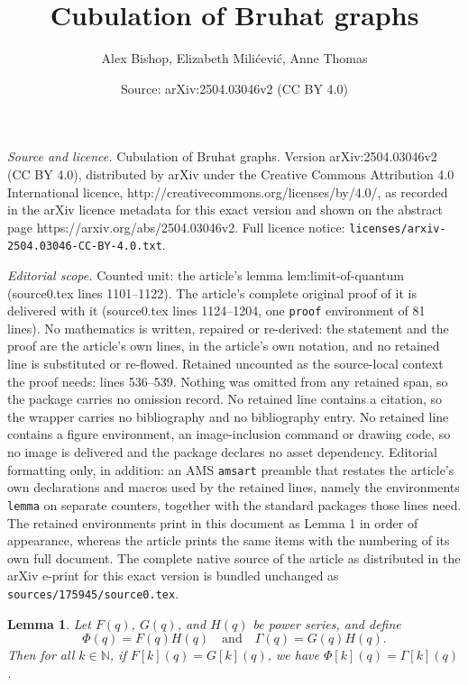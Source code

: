 \documentclass[10pt,a4paper]{amsart}
\title{Cubulation of Bruhat graphs}
\author{Alex Bishop, Elizabeth Mili\'cevi\'c, Anne Thomas}
\date{Source: arXiv:2504.03046v2 (CC BY 4.0)}
\newtheorem{lemma}{Lemma}
\newcommand{\N}{\mathbb{N}}
\begin{document}
\maketitle

\noindent\emph{Source and licence.} Cubulation of Bruhat graphs. Version arXiv:2504.03046v2 (CC BY 4.0), distributed by arXiv under the Creative Commons Attribution 4.0 International licence, http://creativecommons.org/licenses/by/4.0/, as recorded in the arXiv licence metadata for this exact version and shown on the abstract page https://arxiv.org/abs/2504.03046v2. Full licence notice: \texttt{licenses/arxiv-2504.03046-CC-BY-4.0.txt}.\par\smallskip

\noindent\textit{Editorial scope.} Counted unit: the article's lemma lem:limit-of-quantum (source0.tex lines 1101--1122). The article's complete original proof of it is delivered with it (source0.tex lines 1124--1204, one \texttt{proof} environment of 81 lines). No mathematics is written, repaired or re-derived: the statement and the proof are the article's own lines, in the article's own notation, and no retained line is substituted or re-flowed.  Retained uncounted as the source-local context the proof needs: lines 536--539.  Nothing was omitted from any retained span, so the package carries no omission record.  No retained line contains a citation, so the wrapper carries no bibliography and no bibliography entry.  No retained line contains a figure environment, an image-inclusion command or drawing code, so no image is delivered and the package declares no asset dependency.  Editorial formatting only, in addition: an AMS \texttt{amsart} preamble that restates the article's own declarations and macros used by the retained lines, namely the environments \texttt{lemma} on separate counters, together with the standard packages those lines need.  The retained environments print in this document as Lemma 1 in order of appearance, whereas the article prints the same items with the numbering of its own full document.  The complete native source of the article as distributed in the arXiv e-print for this exact version is bundled unchanged as \texttt{sources/175945/source0.tex}.
\begin{lemma}\label{lem:power-series-product-agreement}
	Let $F(q)$, $G(q)$, and $H(q)$ be power series, and define \[ \Phi(q) = F(q)H(q) \quad \mbox{and} \quad \Gamma(q) = G(q)H(q).\]
	Then for all $k \in \N$, if $F[k](q) = G[k](q)$, we have $\Phi[k](q) = \Gamma[k](q)$. 
\end{lemma}
\end{document}
